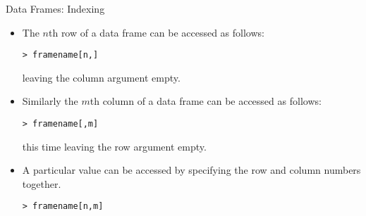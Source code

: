 \documentclass[pdf,default,slideColor,colorBG]{prosper}
\begin{document}


\begin{slide}{Data Frames: Indexing}

\begin{itemize}
\item The $n$th row of a data frame can be accessed as follows:
\begin{verbatim}
> framename[n,]
\end{verbatim}
leaving the column argument empty. \item Similarly the $m$th
column of a data frame can be accessed as follows:
\begin{verbatim}
> framename[,m]
\end{verbatim}
this time leaving the row argument empty.

\item A particular value can be accessed by specifying the row and
column numbers together.
\begin{verbatim}
> framename[n,m]
\end{verbatim}
\end{itemize}

\end{slide}
\end{document}
